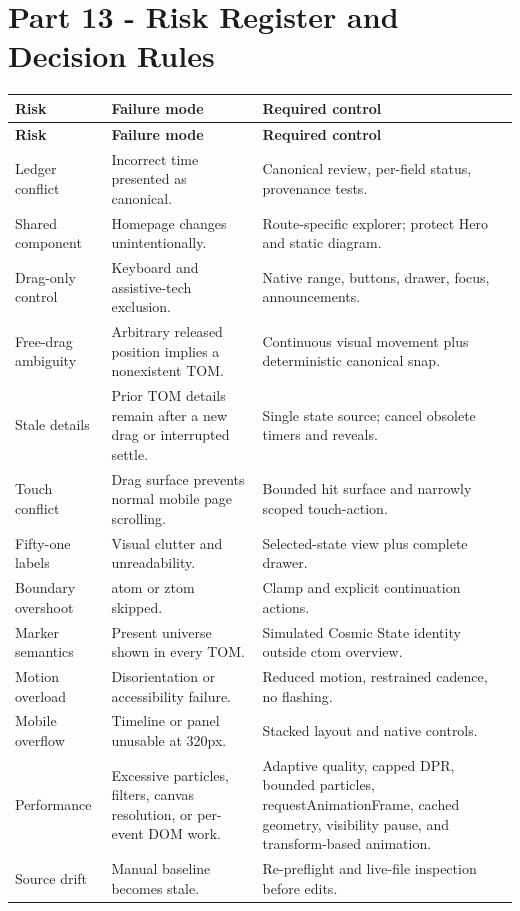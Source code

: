 \documentclass[11pt,letterpaper]{article}
\begin{document}
\section{Part 13 - Risk Register and Decision Rules}
\begin{longtable}{L{1.9in}L{2.35in}L{2.25in}}
\toprule
\textbf{Risk} & \textbf{Failure mode} & \textbf{Required control} \\
\midrule
\endfirsthead
\toprule
\textbf{Risk} & \textbf{Failure mode} & \textbf{Required control} \\
\midrule
\endhead
Ledger conflict & Incorrect time presented as canonical. & Canonical review, per-field status, provenance tests. \\
Shared component & Homepage changes unintentionally. & Route-specific explorer; protect Hero and static diagram. \\
Drag-only control & Keyboard and assistive-tech exclusion. & Native range, buttons, drawer, focus, announcements. \\
Free-drag ambiguity & Arbitrary released position implies a nonexistent TOM. & Continuous visual movement plus deterministic canonical snap. \\
Stale details & Prior TOM details remain after a new drag or interrupted settle. & Single state source; cancel obsolete timers and reveals. \\
Touch conflict & Drag surface prevents normal mobile page scrolling. & Bounded hit surface and narrowly scoped touch-action. \\
Fifty-one labels & Visual clutter and unreadability. & Selected-state view plus complete drawer. \\
Boundary overshoot & atom or ztom skipped. & Clamp and explicit continuation actions. \\
Marker semantics & Present universe shown in every TOM. & Simulated Cosmic State identity outside ctom overview. \\
Motion overload & Disorientation or accessibility failure. & Reduced motion, restrained cadence, no flashing. \\
Mobile overflow & Timeline or panel unusable at 320px. & Stacked layout and native controls. \\
Performance & Excessive particles, filters, canvas resolution, or per-event DOM work. & Adaptive quality, capped DPR, bounded particles, requestAnimationFrame, cached geometry, visibility pause, and transform-based animation. \\
Source drift & Manual baseline becomes stale. & Re-preflight and live-file inspection before edits. \\
\bottomrule
\end{longtable}
\end{document}
